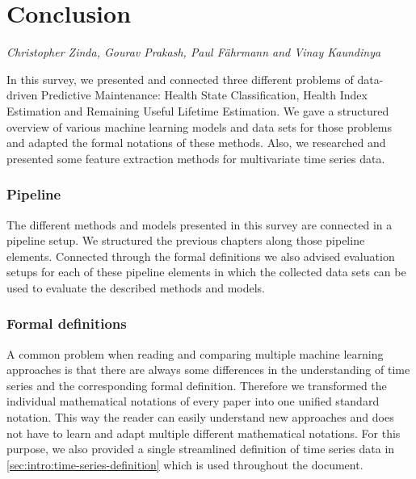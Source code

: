 %
\chapter{Conclusion}
\vspace*{-15mm}
\hfill{\normalsize\emph{Christopher Zinda, Gourav Prakash, Paul Fährmann and Vinay Kaundinya}}
\label{sec:conclusion}


In this survey, we presented and connected three different problems of data-driven Predictive Maintenance: Health State Classification, Health Index Estimation and Remaining Useful Lifetime Estimation. We gave a structured overview of various machine learning models and data sets for those problems and adapted the formal notations of these methods. Also, we researched and presented some feature extraction methods for multivariate time series data.

\subsection*{Pipeline}

The different methods and models presented in this survey are connected in a pipeline setup. We structured the previous chapters along those pipeline elements. Connected through the formal definitions we also advised evaluation setups for each of these pipeline elements in which the collected data sets can be used to evaluate the described methods and models.

\subsection*{Formal definitions}

A common problem when reading and comparing multiple machine learning approaches is that there are always some differences in the understanding of time series and the corresponding formal definition. Therefore we transformed the individual mathematical notations of every paper into one unified standard notation. This way the reader can easily understand new approaches and does not have to learn and adapt multiple different mathematical notations. For this purpose, we also provided a single streamlined definition of time series data in \ref{sec:intro:time-series-definition} which is used throughout the document.


